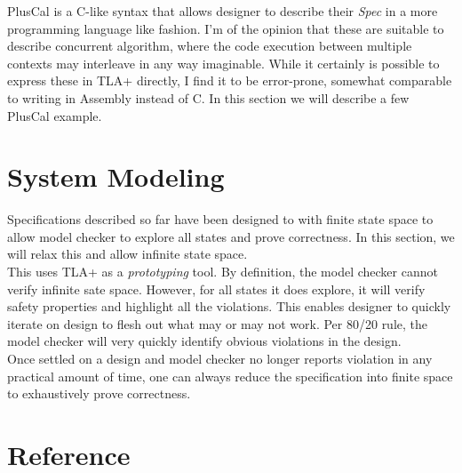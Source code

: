 \documentclass{kdp}
\begin{document}
PlusCal is a C-like syntax that allows designer to describe their \textit{Spec}
in a more programming language like fashion. I'm of the opinion that these are
suitable to describe concurrent algorithm, where the code execution between
multiple contexts may interleave in any way imaginable. While it certainly is
possible to express these in TLA+ directly, I find it to be error-prone,
somewhat comparable to writing in Assembly instead of C. In this section we will
describe a few PlusCal example.





\part{System Modeling}

Specifications described so far have been designed to with finite state space to
allow model checker to explore all states and prove correctness. In this
section, we will relax this and allow infinite state space.\\

This uses TLA+ as a \textit{prototyping} tool. By definition, the model checker
cannot verify infinite sate space. However, for all states it does explore, it
will verify safety properties and highlight all the violations. This enables
designer to quickly iterate on design to flesh out what may or may not work. Per
80/20 rule, the model checker will very quickly identify obvious violations in
the design.\\

Once settled on a design and model checker no longer reports violation in any 
practical amount of time, one can always reduce the specification into finite
space to exhaustively prove correctness. 







\part{Reference}










\end{document}
